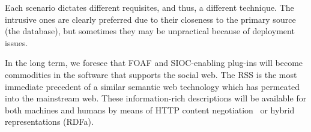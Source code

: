 \documentclass{../templates/www2008-submission}
\begin{document}
Each scenario dictates different requisites, and thus, a different
technique. The intrusive ones are clearly preferred due to their
closeness to the primary source (the database), but sometimes they may be
unpractical because of deployment issues.

In the long term, we foresee that FOAF and SIOC-enabling plug-ins
will become commodities in the software that supports the social
web. The RSS is the most immediate precedent of a similar semantic web
technology which has permeated into the mainstream web. These information-rich
descriptions will
be available for both machines and humans by means of HTTP
content negotiation~\cite{Recipes} or hybrid representations (RDFa).





\balancecolumns
\end{document}
